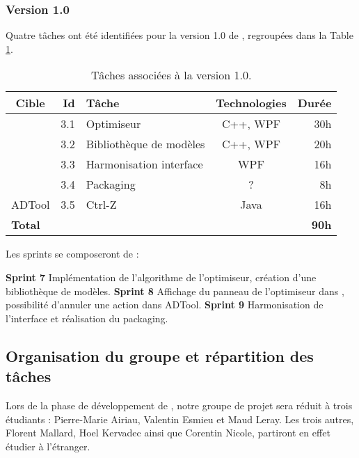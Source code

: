 		\subsubsection{Version 1.0}
			Quatre tâches ont été identifiées pour la version 1.0 de \glasir{}, regroupées dans la {\sc Table} \ref{tab:taches_units_3}.
			\begin{table}[h]
				\centering
				\begin{tabular}{|c|r|l|c|r|}
					\hline
					\textbf{Cible} & \textbf{Id} & \textbf{Tâche} & \textbf{Technologies} & \textbf{Durée}\\
					\hline

					\multirow{4}{*}{\glasir{}} & 3.1 & Optimiseur & C++, WPF & 30h\\
					\cline{2-5}
					 & 3.2 & Bibliothèque de modèles & C++, WPF & 20h\\
					\cline{2-5}
					 & 3.3 & Harmonisation interface & WPF & 16h\\
					\cline{2-5}
					 & 3.4 & Packaging & ? & 8h\\
					\hline

					\multirow{1}{*}{ADTool} & 3.5 & Ctrl-Z & \multirow{1}{*}{Java} & 16h\\
					\hline

					\multicolumn{4}{|l|}{\bf Total} & {\bf 90h}\\
					\hline
				\end{tabular}
				\caption{Tâches associées à la version 1.0.}
				\label{tab:taches_units_3}
			\end{table}
			
			Les sprints se composeront de :

			\noindent\textbf{Sprint 7} Implémentation de l'algorithme de l'optimiseur, création d'une bibliothèque de modèles.\newline
			\textbf{Sprint 8} Affichage du panneau de l'optimiseur dans \glasir{}, possibilité d'annuler une action dans ADTool.\newline
			\textbf{Sprint 9} Harmonisation de l'interface et réalisation du packaging. \newline

	\subsection{Organisation du groupe et répartition des tâches}
		Lors de la phase de développement de \glasir{}, notre groupe de projet sera réduit à trois étudiants : Pierre-Marie {\sc Airiau}, Valentin {\sc Esmieu} et Maud {\sc Leray}. Les trois autres, Florent {\sc Mallard}, Hoel {\sc Kervadec} ainsi que Corentin {\sc Nicole}, partiront en effet étudier à l'étranger.
		
